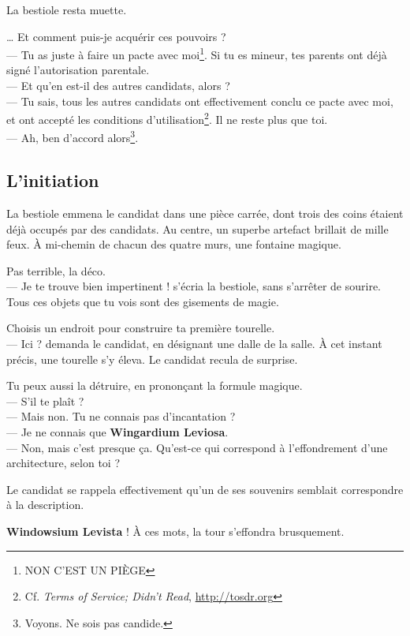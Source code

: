 La bestiole resta muette.

\noindent
\og … Et comment puis-je acquérir ces pouvoirs ?\\
--- Tu as juste à faire un pacte avec moi\footnote{NON C'EST UN PIÈGE}. Si tu es mineur, tes parents ont déjà signé l'autorisation parentale.\\
--- Et qu'en est-il des autres candidats, alors ?\\
--- Tu sais, tous les autres candidats ont effectivement conclu ce pacte avec moi, et ont accepté les conditions d'utilisation\footnote{Cf. \emph{Terms of Service; Didn't Read}, \url{http://tosdr.org}}. Il ne reste plus que toi.\\
--- Ah, ben d'accord alors\footnote{Voyons. Ne sois pas candide.}. \fg

\subsection{L'initiation}

La bestiole emmena le candidat dans une pièce carrée, dont trois des coins étaient déjà occupés par des candidats. Au centre, un superbe artefact brillait de mille feux. À mi-chemin de chacun des quatre murs, une fontaine magique.

\noindent
\og Pas terrible, la déco.\\
--- Je te trouve bien impertinent ! \fg{} s'écria la bestiole, sans s'arrêter de sourire. \og Tous ces objets que tu vois sont des gisements de magie. \fg

\noindent
\og Choisis un endroit pour construire ta première tourelle.\\
--- Ici ? \fg{} demanda le candidat, en désignant une dalle de la salle. À cet instant précis, une tourelle s'y éleva. Le candidat recula de surprise.

\noindent
\og Tu peux aussi la détruire, en prononçant la formule magique.\\
--- \og S'il te plaît \fg{} ?\\
--- Mais non. Tu ne connais pas d'incantation ?\\
--- Je ne connais que \og \textbf{Wingardium Leviosa}. \fg\\
--- Non, mais c'est presque ça. Qu'est-ce qui correspond à l'effondrement d'une architecture, selon toi ? \fg

Le candidat se rappela effectivement qu'un de ses souvenirs semblait correspondre à la description.

\noindent
\og \textbf{Windowsium Levista} ! \fg{} À ces mots, la tour s'effondra brusquement.

